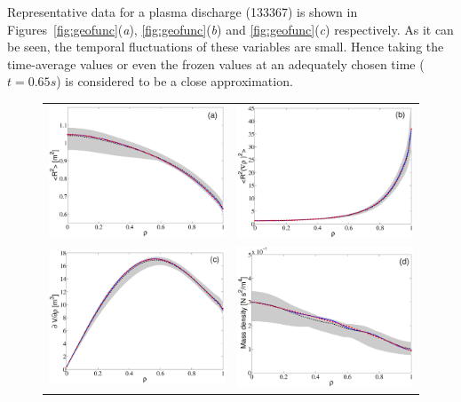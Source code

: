 \documentclass[12pt]{iopart}
\begin{document}
Representative data for a plasma discharge (133367) is shown in Figures~\ref{fig:geofunc}(\emph{a}), \ref{fig:geofunc}(\emph{b}) and \ref{fig:geofunc}(\emph{c}) respectively.  As it can be seen, the temporal fluctuations of these variables are small. Hence taking the time-average values or even the frozen values at an adequately chosen time ($t = 0.65 s$) is considered to be a close approximation. 
\begin{figure} 
\begin{tabular}{cc}
\includegraphics[width=0.5\linewidth]{imene_figs/Goum1} & %
\includegraphics[width= 0.5\linewidth]{imene_figs/Goum2} \\ %
\includegraphics[width=0.5\linewidth]{imene_figs/Goum3} &%
\includegraphics[width=0.5\linewidth]{imene_figs/Goum4} %

\end{tabular}
\end{figure}
\end{document}
